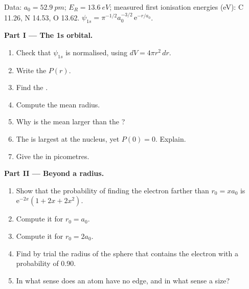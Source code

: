 \begin{problem}
\label{pb:b2:atomic-orbitals:1}
Data: $a_0 = \qty{52.9}{pm}$; $E_R = \qty{13.6}{eV}$; measured first ionisation
energies (\unit{eV}): C 11.26, N 14.53, O 13.62. $\psi_{1s} = \pi^{-1/2}a_0^{-3/2}\,
\mathrm e^{-r/a_0}$.

\medskip
\noindent\textbf{Part I --- The 1s orbital.}
\begin{enumerate}
  \item Check that $\psi_{1s}$ is normalised, using $dV = 4\pi r^2\,dr$.
  \item Write the  $P(r)$.
  \item Find the .
  \item Compute the mean radius.
  \item Why is the mean larger than the ?
  \item The  is largest at the nucleus, yet $P(0) = 0$.
        Explain.
  \item Give the  in picometres.
\end{enumerate}

\medskip
\noindent\textbf{Part II --- Beyond a radius.}
\begin{enumerate}[resume]
  \item Show that the probability of finding the electron farther than $r_0 =
        xa_0$ is $\mathrm e^{-2x}(1 + 2x + 2x^2)$.
  \item Compute it for $r_0 = a_0$.
  \item Compute it for $r_0 = 2a_0$.
  \item Find by trial the radius of the sphere that contains the electron with a
        probability of 0.90.
  \item In what sense does an atom have no edge, and in what sense a size?
\end{enumerate}


\end{problem}
